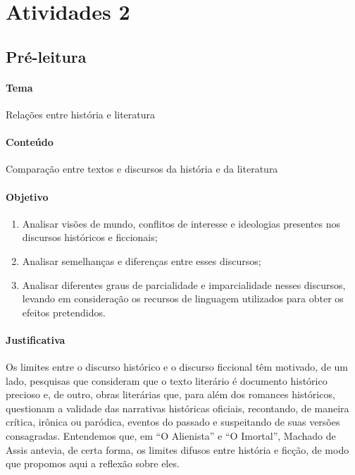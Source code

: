 \documentclass{extarticle}
\begin{document}
\section{Atividades 2}

\subsection{Pré-leitura}


\paragraph{Tema} Relações entre história e literatura\

\paragraph{Conteúdo} Comparação entre textos e discursos da história e da
literatura\

\paragraph{Objetivo}
\begin{enumerate} 
\item Analisar visões de mundo, conflitos de interesse e
ideologias presentes nos discursos históricos e ficcionais; 

\item Analisar
semelhanças e diferenças entre esses discursos; 

\item Analisar diferentes
graus de parcialidade e imparcialidade nesses discursos, levando em
consideração os recursos de linguagem utilizados para obter os efeitos
pretendidos.
\end{enumerate}

\paragraph{Justificativa} Os limites entre o discurso histórico e o
discurso ficcional têm motivado, de um lado, pesquisas que consideram
que o texto literário é documento histórico precioso e, de outro, obras
literárias que, para além dos romances históricos, questionam a validade
das narrativas históricas oficiais, recontando, de maneira crítica,
irônica ou paródica, eventos do passado e suspeitando de suas versões
consagradas. Entendemos que, em ``O Alienista'' e ``O Imortal'', Machado
de Assis antevia, de certa forma, os limites difusos entre história e
ficção, de modo que propomos aqui a reflexão sobre eles.
\end{document}
